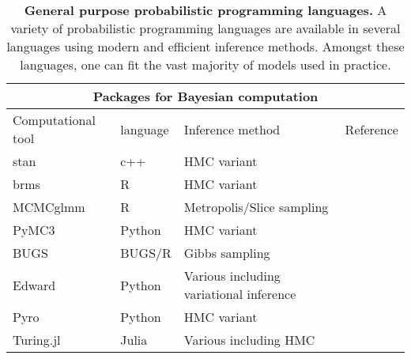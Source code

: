 \documentclass[12pt,english]{article}
\begin{document}
\begin{table}[ht]
	\centering
	
	\begin{tabular}{ |p{3cm}||p{2cm}|p{7cm}|p{5cm}|  }
		\hline
		\multicolumn{4}{|c|}{Packages for Bayesian computation} \\
		\hline
		Computational tool & language & Inference method & Reference\\
		\hline
		stan   & c++   &HMC variant&   \citep{Carpenter::2017}\\
		brms &   R  & HMC variant   & \citep{Burkner::2017}\\
		MCMCglmm & R & Metropolis/Slice sampling &  \citep{Hadfield::2010}\\
		PyMC3    & Python & HMC variant&  \citep{Salvatier::2016}\\
		BUGS &   BUGS/R  & Gibbs sampling & \citep{Lunn::2009}\\
		Edward&  Python  & Various including variational inference   &\citep{Tran::2016}\\
		Pyro & Python & HMC variant& \citep{Bingham::2019}\\
		Turing.jl & Julia & Various including HMC & \citep{Ge::2018}\\
		\hline
	\end{tabular}
\caption{\textbf{General purpose probabilistic programming languages.} A variety of probabilistic programming languages are available in several languages using modern and efficient inference methods. Amongst these languages, one can fit the vast majority of models used in practice.}
\label{table::bayesian computation}
\end{table}
\end{document}
